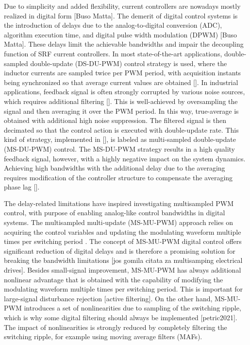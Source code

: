 \documentclass[journal]{IEEEtran}
\begin{document}
Due to simplicity and added flexibility, current controllers are nowadays mostly realized in digital form [Buso Matta]. The demerit of digital control systems is the introduction of delays due to the analog-to-digital conversion (ADC), algorithm execution time, and digital pulse width modulation (DPWM) [Buso Matta]. These delays limit the achievable bandwidths and impair the decoupling function of SRF current controllers. 
In most state-of-the-art applications, double-sampled double-update (DS-DU-PWM) control strategy is used, where the inductor currents are sampled twice per PWM period, with acquisition instants being synchronized so that average current values are obtained []. In industrial applications, feedback signal is often strongly corrupted by various noise sources, which requires additional filtering []. This is well-achieved by oversampling the signal and then averaging it over the PWM period. In this way, true-average is obtained with additional high noise suppression. The filtered signal is then decimated so that the control action is executed with double-update rate. This kind of strategy, implemented in [], is labeled as multi-sampled double-update (MS-DU-PWM) control. The MS-DU-PWM strategy results in a high quality feedback signal, however, with a highly negative impact on the system dynamics. Achieving high bandwidths with the additional delay due to the averaging requires modification of the controller structure to compensate the averaging phase lag [].

The delay-related limitations have inspired investigating multisampled PWM control, with purpose of enabling analog-like control bandwidths in digital systems. The multisampled multi-update (MS-MU-PWM) approach relies on acquiring the control variables and updating the modulating waveform multiple times per switching period \cite{corradini_analysis}. The concept of MS-MU-PWM digital control offers significant reduction of digital delays and is therefore a promising solution for breaking the bandwidth limitations \cite{corradini2018} [jos gomila citata za multisamping electrical drives]. Besides small-signal improvement, MS-MU-PWM has always additional nonlinear advantage that is obtained with the capability of modifying the modulating waveform multiple times per switching period. This is important for large-signal disturbance rejection [active filtering]. On the other hand, MS-MU-PWM introduces a set of nonlinearities due to sampling of the switching ripple, which is why some digital filtering should always be implemented [petric2021]. The impact of nonlinearities is strongly reduced by completely filtering the switching ripple, for example using moving average filters (MAFs).
\end{document}
